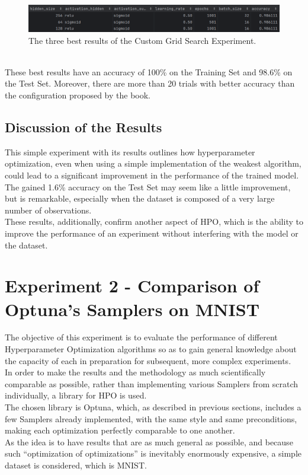 \begin{figure}[b]
	\centering
	\includegraphics[width=15cm]{figures/figure-4.1.2.png}
	\caption[Best Results of Custom Grid Search Experiment]{The three best results of the Custom Grid Search Experiment.}
	\label{fig:figure-4.1.2}
\end{figure}
\\[0.3cm]These best results have an accuracy of 100\% on the Training Set and 98.6\% on the Test Set. Moreover, there are more than 20 trials with better accuracy than the configuration proposed by the book.

\subsection{Discussion of the Results}

This simple experiment with its results outlines how hyperparameter optimization, even when using a simple implementation of the weakest algorithm, could lead to a significant improvement in the performance of the trained model.
\\[0.3cm]The gained 1.6\% accuracy on the Test Set may seem like a little improvement, but is remarkable, especially when the dataset is composed of a very large number of observations.
\\[0.3cm]These results, additionally, confirm another aspect of HPO, which is the ability to improve the performance of an experiment without interfering with the model or the dataset.

\section{Experiment 2 - Comparison of Optuna's Samplers on MNIST}\label{sec:Experiment2-4.2}

The objective of this experiment is to evaluate the performance of different Hyperparameter Optimization algorithms so as to gain general knowledge about the capacity of each in preparation for subsequent, more complex experiments.
\\[0.3cm]In order to make the results and the methodology as much scientifically comparable as possible, rather than implementing various Samplers from scratch individually, a library for HPO is used.
\\[0.3cm]The chosen library is Optuna, which, as described in previous sections, includes a few Samplers already implemented, with the same style and same preconditions, making each optimization perfectly comparable to one another.
\\[0.3cm]As the idea is to have results that are as much general as possible, and because such “optimization of optimizations” is inevitably enormously expensive, a simple dataset is considered, which is MNIST.


